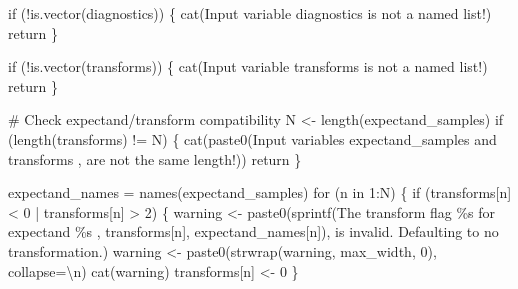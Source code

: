 \documentclass[
  letterpaper,
  DIV=11,
  numbers=noendperiod]{scrartcl}
\newenvironment{Shaded}{\begin{snugshade}}{\end{snugshade}}
\newcommand{\AttributeTok}[1]{\textcolor[rgb]{0.40,0.45,0.13}{#1}}
\newcommand{\CommentTok}[1]{\textcolor[rgb]{0.37,0.37,0.37}{#1}}
\newcommand{\ControlFlowTok}[1]{\textcolor[rgb]{0.00,0.23,0.31}{#1}}
\newcommand{\DecValTok}[1]{\textcolor[rgb]{0.68,0.00,0.00}{#1}}
\newcommand{\FunctionTok}[1]{\textcolor[rgb]{0.28,0.35,0.67}{#1}}
\newcommand{\NormalTok}[1]{\textcolor[rgb]{0.00,0.23,0.31}{#1}}
\newcommand{\OtherTok}[1]{\textcolor[rgb]{0.00,0.23,0.31}{#1}}
\newcommand{\SpecialCharTok}[1]{\textcolor[rgb]{0.37,0.37,0.37}{#1}}
\newcommand{\StringTok}[1]{\textcolor[rgb]{0.13,0.47,0.30}{#1}}
\begin{document}
\begin{Shaded}
\begin{Highlighting}[]
  \ControlFlowTok{if}\NormalTok{ (}\SpecialCharTok{!}\FunctionTok{is.vector}\NormalTok{(diagnostics)) \{}
    \FunctionTok{cat}\NormalTok{(}\StringTok{\textquotesingle{}Input variable \textasciigrave{}diagnostics\textasciigrave{} is not a named list!\textquotesingle{}}\NormalTok{)}
\NormalTok{    return}
\NormalTok{  \}}
  
  \ControlFlowTok{if}\NormalTok{ (}\SpecialCharTok{!}\FunctionTok{is.vector}\NormalTok{(transforms)) \{}
    \FunctionTok{cat}\NormalTok{(}\StringTok{\textquotesingle{}Input variable \textasciigrave{}transforms\textasciigrave{} is not a named list!\textquotesingle{}}\NormalTok{)}
\NormalTok{    return}
\NormalTok{  \}}
  
  \CommentTok{\# Check expectand/transform compatibility}
\NormalTok{  N }\OtherTok{\textless{}{-}} \FunctionTok{length}\NormalTok{(expectand\_samples)}
  \ControlFlowTok{if}\NormalTok{ (}\FunctionTok{length}\NormalTok{(transforms) }\SpecialCharTok{!=}\NormalTok{ N) \{}
    \FunctionTok{cat}\NormalTok{(}\FunctionTok{paste0}\NormalTok{(}\StringTok{\textquotesingle{}Input variables \textasciigrave{}expectand\_samples\textasciigrave{} and \textasciigrave{}transforms\textasciigrave{} \textquotesingle{}}\NormalTok{, }
               \StringTok{\textquotesingle{}are not the same length!\textquotesingle{}}\NormalTok{))}
\NormalTok{    return}
\NormalTok{  \}}
  
\NormalTok{  expectand\_names }\OtherTok{=} \FunctionTok{names}\NormalTok{(expectand\_samples)}
  \ControlFlowTok{for}\NormalTok{ (n }\ControlFlowTok{in} \DecValTok{1}\SpecialCharTok{:}\NormalTok{N) \{}
    \ControlFlowTok{if}\NormalTok{ (transforms[n] }\SpecialCharTok{\textless{}} \DecValTok{0} \SpecialCharTok{|}\NormalTok{ transforms[n] }\SpecialCharTok{\textgreater{}} \DecValTok{2}\NormalTok{) \{}
\NormalTok{      warning }\OtherTok{\textless{}{-}} 
        \FunctionTok{paste0}\NormalTok{(}\FunctionTok{sprintf}\NormalTok{(}\StringTok{\textquotesingle{}The transform flag \%s for expectand \%s \textquotesingle{}}\NormalTok{, }
\NormalTok{                       transforms[n], expectand\_names[n]),}
               \StringTok{\textquotesingle{}is invalid.  Defaulting to no transformation.\textquotesingle{}}\NormalTok{)}
\NormalTok{      warning }\OtherTok{\textless{}{-}} \FunctionTok{paste0}\NormalTok{(}\FunctionTok{strwrap}\NormalTok{(warning, max\_width, }\DecValTok{0}\NormalTok{), }\AttributeTok{collapse=}\StringTok{\textquotesingle{}}\SpecialCharTok{\textbackslash{}n}\StringTok{\textquotesingle{}}\NormalTok{)}
      \FunctionTok{cat}\NormalTok{(warning)}
\NormalTok{      transforms[n] }\OtherTok{\textless{}{-}} \DecValTok{0}
\NormalTok{    \}}
    

\end{Highlighting}
\end{Shaded}
\end{document}
